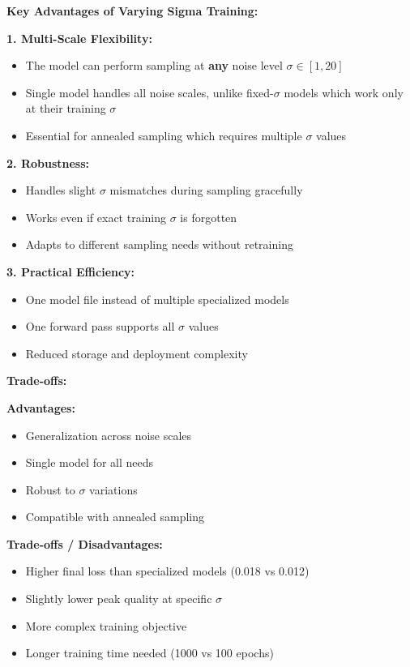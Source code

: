 \documentclass[journal]{IEEEtran}
\begin{document}
\textbf{Key Advantages of Varying Sigma Training:}

\textbf{1. Multi-Scale Flexibility:}
\begin{itemize}
    \item The model can perform sampling at \textbf{any} noise level $\sigma \in [1, 20]$
    \item Single model handles all noise scales, unlike fixed-$\sigma$ models which work only at their training $\sigma$
    \item Essential for annealed sampling which requires multiple $\sigma$ values
\end{itemize}

\textbf{2. Robustness:}
\begin{itemize}
    \item Handles slight $\sigma$ mismatches during sampling gracefully
    \item Works even if exact training $\sigma$ is forgotten
    \item Adapts to different sampling needs without retraining
\end{itemize}

\textbf{3. Practical Efficiency:}
\begin{itemize}
    \item One model file instead of multiple specialized models
    \item One forward pass supports all $\sigma$ values
    \item Reduced storage and deployment complexity
\end{itemize}

\textbf{Trade-offs:}

\textbf{Advantages:}
\begin{itemize}
    \item Generalization across noise scales
    \item Single model for all needs
    \item Robust to $\sigma$ variations
    \item Compatible with annealed sampling
\end{itemize}

\textbf{Trade-offs / Disadvantages:}
\begin{itemize}
    \item Higher final loss than specialized models (0.018 vs 0.012)
    \item Slightly lower peak quality at specific $\sigma$
    \item More complex training objective
    \item Longer training time needed (1000 vs 100 epochs)
\end{itemize}
\end{document}
